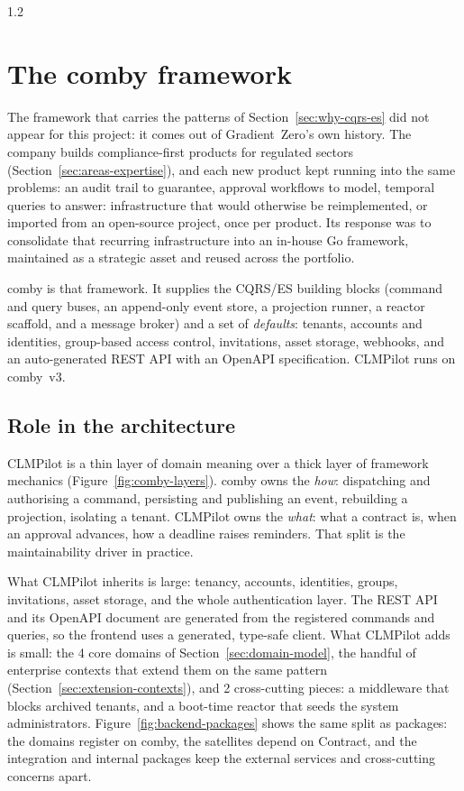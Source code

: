 \begin{spacing}{1.2}
\section{The comby framework}
\label{sec:comby}

The framework that carries the patterns of
Section~\ref{sec:why-cqrs-es} did not appear for this project: it comes
out of Gradient~Zero's own history. The company builds compliance-first
products for regulated sectors
(Section~\ref{sec:areas-expertise}), and each new product kept running
into the same problems: an audit trail to guarantee, approval workflows
to model, temporal queries to answer: infrastructure that would
otherwise be reimplemented, or imported from an open-source project, once
per product. Its response was to consolidate that recurring
infrastructure into an in-house Go framework, maintained as a strategic
asset and reused across the portfolio.

comby is that framework. It supplies the CQRS/ES building blocks
(command and query buses, an append-only event store, a projection runner,
a reactor scaffold, and a message broker) and a set of \textit{defaults}:
tenants, accounts and identities, group-based access control, invitations,
asset storage, webhooks, and an auto-generated REST API with an OpenAPI
specification. CLMPilot runs on comby~v3.

\subsection{Role in the architecture}
\label{sec:comby-role}

CLMPilot is a thin layer of domain meaning over a thick layer of framework
mechanics (Figure~\ref{fig:comby-layers}). comby owns the \emph{how}:
dispatching and authorising a command, persisting and publishing an event,
rebuilding a projection, isolating a tenant. CLMPilot owns the \emph{what}:
what a contract is, when an approval advances, how a deadline raises
reminders. That split is the maintainability driver in practice.


What CLMPilot inherits is large: tenancy, accounts, identities, groups,
invitations, asset storage, and the whole authentication layer. The REST
API and its OpenAPI document are generated from the registered commands and
queries, so the frontend uses a generated, type-safe client. What CLMPilot
adds is small: the 4 core domains of Section~\ref{sec:domain-model}, the
handful of enterprise contexts that extend them on the same pattern
(Section~\ref{sec:extension-contexts}), and 2 cross-cutting pieces: a
middleware that blocks archived tenants, and a boot-time reactor that seeds
the system administrators.
Figure~\ref{fig:backend-packages} shows the same split as packages: the
domains register on comby, the satellites depend on Contract, and the
integration and internal packages keep the external services and
cross-cutting concerns apart.


\end{spacing}
